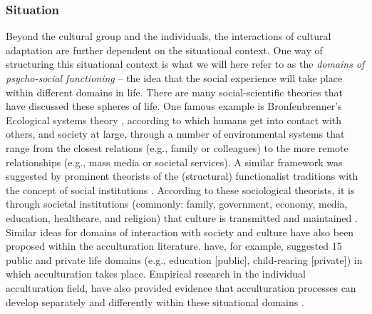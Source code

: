 \documentclass[man, 12pt, a4paper]{apa7}
\begin{document}
\subsubsection{Situation} 
Beyond the cultural group and the individuals, the interactions of cultural adaptation are further dependent on the situational context. One way of structuring this situational context is what we will here refer to as the \textit{domains of psycho-social functioning} -- the idea that the social experience will take place within different domains in life. There are many social-scientific theories that have discussed these spheres of life. One famous example is Bronfenbrenner's Ecological systems theory \citep{Bronfenbrenner1992}, according to which humans get into contact with others, and society at large, through a number of environmental systems that range from the closest relations (e.g., family or colleagues) to the more remote relationships (e.g., mass media or societal services). A similar framework was suggested by prominent theorists of the (structural) functionalist traditions with the concept of social institutions \citep[e.g.,][]{Turner1997}. According to these sociological theorists, it is through societal institutions (commonly: family, government, economy, media, education, healthcare, and religion) that culture is transmitted and maintained \citep[e.g.,][]{Durkheim1982}. Similar ideas for domains of interaction with society and culture have also been proposed within the acculturation literature. \citet{Arends-Toth2006, Arends-Toth2007} have, for example, suggested 15 public and private life domains (e.g., education [public], child-rearing [private]) in which acculturation takes place. Empirical research in the individual acculturation field, have also provided evidence that acculturation processes can develop separately and differently within these situational domains \citep[e.g.,][]{Arends-Toth2003a}. 
\end{document}
